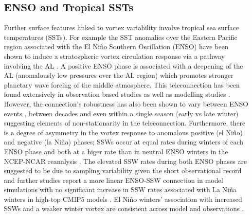 \subsection{ENSO and Tropical SSTs}
\label{sec:external_influence_SSTs}
Further surface features linked to vortex variability involve tropical sea surface temperatures (SSTs). For example the SST anomalies over the Eastern Pacific region associated with the El Ni\~{n}o Southern Oscillation (ENSO) have been shown to induce a stratospheric vortex circulation response via a pathway involving the AL \citep{domeisenTeleconnection2019d}. A positive ENSO phase is associated with a deepening of the AL (anomalously low pressures over the AL region) which promotes stronger planetary wave forcing of the middle atmosphere. This teleconnection has been found extensively in observation based studies \citep{garfinkelDifferent2008b, inesonRole2009b, smithLinear2012b} as well as modelling studies \citep{bellStratospheric2009b, domeisenSeasonal2015b, manziniInfluence2006b, richterEffects2015b}. However, the connection's robustness has also been shown to vary between ENSO events \citep{deserNorthern2017b, izaStratospheric2016b}, between decades \citep{ayarzaguena2018} and even within a single season (early vs late winter) \citep{ayarzaguenaIntraseasonal2018d} suggesting elements of non-stationarity in the teleconnection. Furthermore, there is a degree of asymmetry in the vortex response to anomalous positive (el Ni\~{n}o) and negative (la Ni\~{n}a) phases; SSWs occur at equal rates during winters of each ENSO phase and both at a higer rate than in neutral ENSO winters in the NCEP-NCAR reanalysis \citep{butlerNino2011b, garfinkelWhy2012b}. The elevated SSW rates during both ENSO phases are suggested to be due to sampling variability given the short observational record and further studies report a more linear ENSO-SSW connection in model simulations \citep{polvaniDistinguishing2017b} with no significant increase in SSW rates associated with La Ni\~{n}a winters in high-top CMIP5 models \citep{songRevisiting2018b}. El Ni\~{n}o winters' association with increased SSWs and a weaker winter vortex are consistent across model and observations \citep{manziniInfluence2006b, richterEffects2015b}. 


